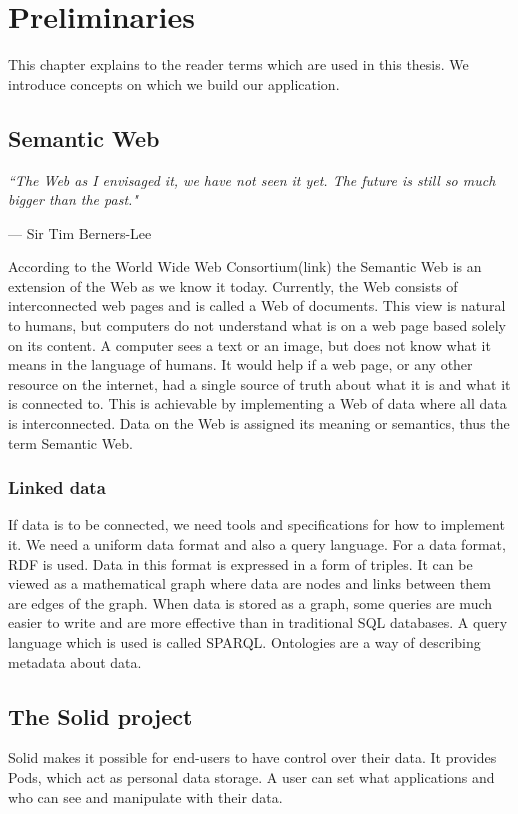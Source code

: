 \setlength{\epigraphwidth}{.5\textwidth}
\setlength\epigraphrule{0pt}

\chapter{Preliminaries}
This chapter explains to the reader terms which are used in this thesis.
We introduce concepts on which we build our application.

\section{Semantic Web}
\epigraph{\textit{``The Web as I envisaged it, we have not seen it yet. The future is still so much bigger than the past."}}{--- Sir Tim Berners-Lee}

According to the World Wide Web Consortium(link) the Semantic Web is an extension of the Web as we know it today.
Currently, the Web consists of interconnected web pages and is called a Web of documents.
This view is natural to humans, but computers do not understand what is on a web page based solely on its content. 
A computer sees a text or an image, but does not know what it means in the language of humans.
It would help if a web page, or any other resource on the internet, had a single source of truth about what it is and what it is connected to.
This is achievable by implementing a Web of data where all data is interconnected.
Data on the Web is assigned its meaning or semantics, thus the term Semantic Web.

\subsection*{Linked data}
If data is to be connected, we need tools and specifications for how to implement it.
We need a uniform data format and also a query language.
For a data format, RDF is used.
Data in this format is expressed in a form of triples.
It can be viewed as a mathematical graph where data are nodes and links between them are edges of the graph.
When data is stored as a graph, some queries are much easier to write and are more effective than in traditional SQL databases.
A query language which is used is called SPARQL.
Ontologies are a way of describing metadata about data.


\section{The Solid project}
Solid makes it possible for end-users to have control over their data.
It provides Pods, which act as personal data storage.
A user can set what applications and who can see and manipulate with their data.
